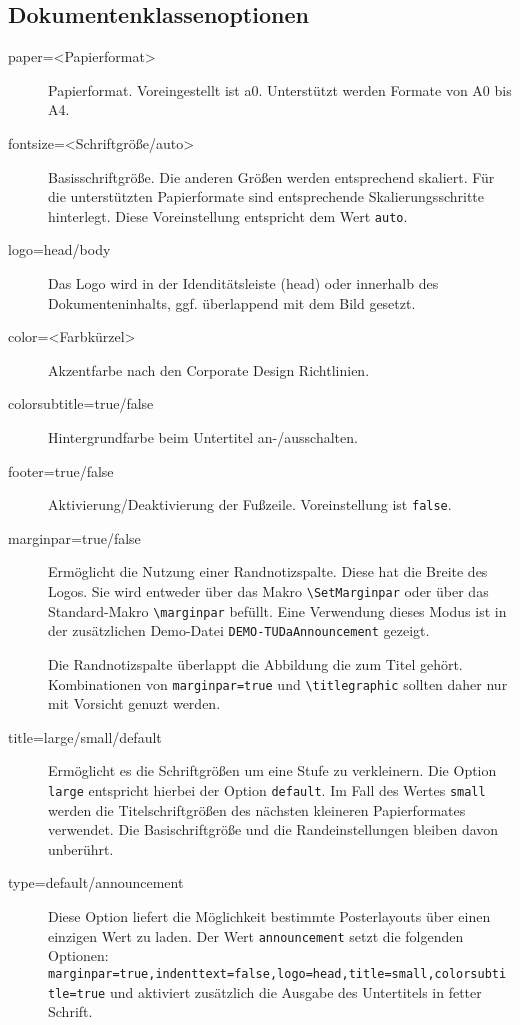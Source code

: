 \documentclass[
	german,%
	paper=a0,%
	accentcolor=9c,%
	logo=body,%
	footer=true,
]{tudaposter}
\newcommand*{\file}[1]{\texttt{#1}}
\newcommand*{\code}[1]{\texttt{#1}}
\let\tbs\textbackslash
\begin{document}
\begin{multicols}{2}
	\subsection*{Dokumentenklassenoptionen}
	\begin{description}
		\item[paper=<Papierformat>] Papierformat. Voreingestellt ist a0. Unterstützt werden Formate von A0 bis A4.
		\item[fontsize=<Schriftgröße/auto>] Basisschriftgröße. Die anderen Größen werden entsprechend skaliert. Für die unterstützten Papierformate sind entsprechende Skalierungsschritte hinterlegt. Diese Voreinstellung entspricht dem Wert \code{auto}.
		\item[logo=head/body] Das Logo wird in der Idenditätsleiste (head) oder innerhalb des Dokumenteninhalts, ggf. überlappend mit dem Bild gesetzt.
		\item[color=<Farbkürzel>] Akzentfarbe nach den Corporate Design Richtlinien.
		\item[colorsubtitle=true/false] Hintergrundfarbe beim Untertitel an-/ausschalten.
		\item[footer=true/false] Aktivierung/Deaktivierung der Fußzeile. Voreinstellung ist \code{false}.
		\item[marginpar=true/false] Ermöglicht die Nutzung einer Randnotizspalte. Diese hat die Breite des Logos. Sie wird entweder über das Makro \code{\tbs{}SetMarginpar} oder über das Standard-Makro \code{\tbs{}marginpar} befüllt. Eine Verwendung dieses Modus ist in der zusätzlichen Demo-Datei \file{DEMO-TUDaAnnouncement} gezeigt.

		      Die Randnotizspalte überlappt die Abbildung die zum Titel gehört. Kombinationen von \code{marginpar=true} und \code{\tbs{}titlegraphic} sollten daher nur mit Vorsicht genuzt werden.
		\item[title=large/small/default] Ermöglicht es die Schriftgrößen um eine Stufe zu verkleinern. Die Option \code{large} entspricht hierbei der Option \code{default}. Im Fall des Wertes \code{small} werden die Titelschriftgrößen des nächsten kleineren Papierformates verwendet. Die Basischriftgröße und die Randeinstellungen bleiben davon unberührt.
		\item[type=default/announcement] Diese Option liefert die Möglichkeit bestimmte Posterlayouts über einen einzigen Wert zu laden.
		      Der Wert \code{announcement} setzt die folgenden Optionen: \code{marginpar=true,indenttext=false,logo=head,title=small,colorsubtitle=true} und aktiviert zusätzlich die Ausgabe des Untertitels in fetter Schrift.
	\end{description}
\end{multicols}
\end{document}
